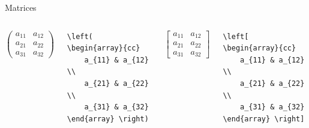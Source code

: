 \documentclass[../slides.tex]{subfiles}
\begin{document}
    \begin{frame}[fragile]{Matrices}
        \begin{columns}
                \[ \left(
                    \begin{array}{ccc}
                        a_{11} & a_{12} \\
                        a_{21} & a_{22} \\  
                        a_{31} & a_{32}
                    \end{array}
                    \right)
                \] 
\begin{verbatim}
\left( \begin{array}{cc}
    a_{11} & a_{12} \\
    a_{21} & a_{22} \\  
    a_{31} & a_{32}
\end{array} \right)
\end{verbatim}
                
                \[ \left[
                    \begin{array}{ccc}
                        a_{11} & a_{12} \\
                        a_{21} & a_{22} \\  
                        a_{31} & a_{32}
                    \end{array}
                    \right]
                \] 
\begin{verbatim}
\left[ \begin{array}{cc}
    a_{11} & a_{12} \\
    a_{21} & a_{22} \\  
    a_{31} & a_{32}
\end{array} \right]
\end{verbatim}
                
        \end{columns}
    \end{frame}
    
\end{document}
